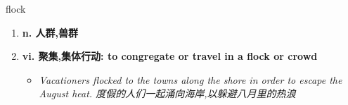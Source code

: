 
\begin{frame}
{\huge flock}
\begin{center}
\begin{enumerate}\Large
  \item \textbf{n. 人群,兽群}
  \item \textbf{vi. 聚集,集体行动: to congregate or travel in a flock or crowd}
  \begin{itemize}
    \item \em{\Large{Vacationers flocked to the towns along the shore in order to escape the August heat. 度假的人们一起涌向海岸,以躲避八月里的热浪}}
  \end{itemize}
\end{enumerate}
\end{center}
\end{frame}
